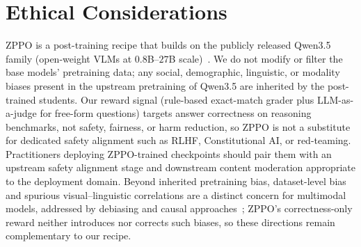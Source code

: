\section*{Ethical Considerations}
\label{sec:ethics}

ZPPO is a post-training recipe that builds on the publicly released Qwen3.5 family (open-weight VLMs at $0.8$B--$27$B scale)~\citep{qwen3.5}. We do not modify or filter the base models' pretraining data; any social, demographic, linguistic, or modality biases present in the upstream pretraining of Qwen3.5 are inherited by the post-trained students. Our reward signal (rule-based exact-match grader plus LLM-as-a-judge for free-form questions) targets answer correctness on reasoning benchmarks, not safety, fairness, or harm reduction, so ZPPO is not a substitute for dedicated safety alignment such as RLHF, Constitutional AI, or red-teaming. Practitioners deploying ZPPO-trained checkpoints should pair them with an upstream safety alignment stage and downstream content moderation appropriate to the deployment domain. Beyond inherited pretraining bias, dataset-level bias and spurious visual--linguistic correlations are a distinct concern for multimodal models, addressed by debiasing and causal approaches~\citep{10222502,KIM2026112173}; ZPPO's correctness-only reward neither introduces nor corrects such biases, so these directions remain complementary to our recipe.
